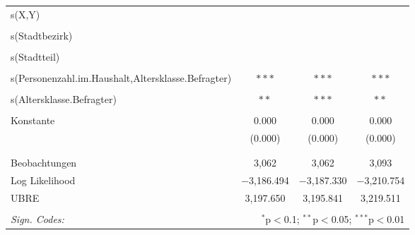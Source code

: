 \documentclass{Vorlage}
\begin{document}
\begin{appendix}
\begin{table}[h]
\begin{tabular}{@{\extracolsep{5pt}}lccc}
 s(X,Y) &  &  &  \\ 
  & & & \\ 
 s(Stadtbezirk) &  &  &  \\ 
  & & & \\ 
 s(Stadtteil)&  &  &  \\ 
  & & & \\ 
 s(Personenzahl.im.Haushalt,Altersklasse.Befragter) & $***$ & $***$ & $***$  \\ 
  & & & \\ 
 s(Altersklasse.Befragter) & $**$ & $***$  & $**$ \\ 
  & & & \\ 
 Konstante & 0.000 & 0.000 & 0.000 \\ 
  & (0.000) & (0.000) & (0.000) \\ 
  & & & \\ 
\hline \\[-1.8ex] 
Beobachtungen & 3,062 & 3,062 & 3,093 \\ 
Log Likelihood & $-$3,186.494 & $-$3,187.330 & $-$3,210.754 \\ 
UBRE & 3,197.650 & 3,195.841 & 3,219.511 \\ 
\hline 
\hline \\[-1.8ex] 
\textit{Sign. Codes:}  & \multicolumn{3}{r}{$^{*}$p$<$0.1; $^{**}$p$<$0.05; $^{***}$p$<$0.01} \\ 
\end{tabular} 
\end{table} 


\end{appendix}
\end{document}
